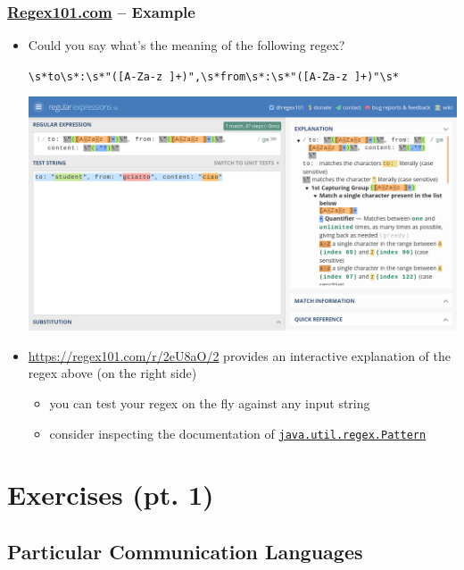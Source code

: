 \documentclass[presentation]{beamer}\mode<presentation>{\usetheme{AMSCesenaPurpleAndGold}}
\newcommand{\bs}[1]{\textbackslash{}#1}
\begin{document}
\begin{frame}
	\frametitle{\href{https://regex101.com/}{Regex101.com} -- Example}
	
	\begin{itemize}
		\item Could you say what's the meaning of the following regex?
		\begin{center}\small
			\alert{\texttt{\bs{s}*to\bs{s}*:\bs{s}*"([A-Za-z ]+)",\bs{s}*from\bs{s}*:\bs{s}*"([A-Za-z ]+)"\bs{s}*}}
		\end{center}
		\begin{center}
			\includegraphics[width=.7\linewidth]{./img/regex101.png}
		\end{center}
		
		\item \url{https://regex101.com/r/2eU8aO/2} provides an interactive explanation of the regex above (on the right side) 
		\begin{itemize}
			\item you can test your regex on the fly against any input string
			\item consider inspecting the documentation of \href{https://docs.oracle.com/en/java/javase/14/docs/api/java.base/java/util/regex/Pattern.html}{\texttt{java.util.regex.\alert{Pattern}}}
		\end{itemize}		
		
	\end{itemize}  
\end{frame}

\section{Exercises (pt. 1)}

\startExercise

\subsection{Particular Communication Languages} 
\end{document}
